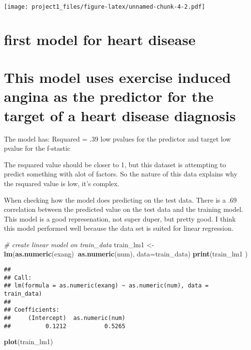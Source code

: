 \documentclass[]{article}
\newenvironment{Shaded}{\begin{snugshade}}{\end{snugshade}}
\newcommand{\KeywordTok}[1]{\textcolor[rgb]{0.13,0.29,0.53}{\textbf{#1}}}
\newcommand{\DataTypeTok}[1]{\textcolor[rgb]{0.13,0.29,0.53}{#1}}
\newcommand{\StringTok}[1]{\textcolor[rgb]{0.31,0.60,0.02}{#1}}
\newcommand{\CommentTok}[1]{\textcolor[rgb]{0.56,0.35,0.01}{\textit{#1}}}
\newcommand{\OperatorTok}[1]{\textcolor[rgb]{0.81,0.36,0.00}{\textbf{#1}}}
\newcommand{\NormalTok}[1]{#1}
\begin{document}
\texttt{[image: project1\_files/figure-latex/unnamed-chunk-4-2.pdf]}

\section{first model for heart
disease}\label{first-model-for-heart-disease}

\section{This model uses exercise induced angina as the predictor for
the target of a heart disease
diagnosis}\label{this-model-uses-exercise-induced-angina-as-the-predictor-for-the-target-of-a-heart-disease-diagnosis}

The model has: Rsquared = .39 low pvalues for the predictor and target
low pvalue for the f-stastic

The rsquared value should be closer to 1, but this dataset is attempting
to predict something with alot of factors. So the nature of this data
explains why the rsquared value is low, it's complex.

When checking how the model does predicting on the test data. There is a
.69 correlation between the predicted value on the test data and the
training model. This model is a good represenation, not super duper, but
pretty good. I think this model performed well because the data set is
suited for linear regression.

\begin{Shaded}
\begin{Highlighting}[]
\CommentTok{# create linear model on train_data}
\NormalTok{train_lm1 <-}\StringTok{ }\KeywordTok{lm}\NormalTok{(}\KeywordTok{as.numeric}\NormalTok{(exang)}\OperatorTok{~}\KeywordTok{as.numeric}\NormalTok{(num), }\DataTypeTok{data=}\NormalTok{train_data)}
\KeywordTok{print}\NormalTok{(train_lm1 )}
\end{Highlighting}
\end{Shaded}

\begin{verbatim}
## 
## Call:
## lm(formula = as.numeric(exang) ~ as.numeric(num), data = train_data)
## 
## Coefficients:
##     (Intercept)  as.numeric(num)  
##          0.1212           0.5265
\end{verbatim}

\begin{Shaded}
\begin{Highlighting}[]
\KeywordTok{plot}\NormalTok{(train_lm1)}
\end{Highlighting}
\end{Shaded}
\end{document}
